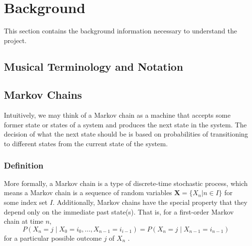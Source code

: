 \chapter{Background} \label{bg}

This section contains the background information necessary to understand the project. %




\section{Musical Terminology and Notation} \label{bg:musicTerminology}


\section[Markov Chains]{Markov Chains} \label{bg:markov}

Intuitively, we may think of a Markov chain as a machine that accepts some former state or states of a system and produces the next state in the system.
The decision of what the next state should be is based on probabilities of transitioning to different states from the current state of the system.

\subsection{Definition} \label{bg:markov:definitions}

More formally, a Markov chain is a type of discrete-time stochastic process, which means a Markov chain is a sequence of random variables $\boldsymbol{X} = \{X_{n} | n \in I\}$ for some index set $I$.
Additionally, Markov chains have the special property that they depend only on the immediate past state(s).
That is, for a first-order Markov chain at time $n$, $$P(X_{n} = j \mid X_{0} = i_{0}, \ldots, X_{n - 1} = i_{i - 1}) = P(X_{n} = j \mid X_{n - 1} = i_{n - 1})$$ for a particular possible outcome $j$ of $X_{n}$ \cite{nierhaus_algorithmic_2009}.

